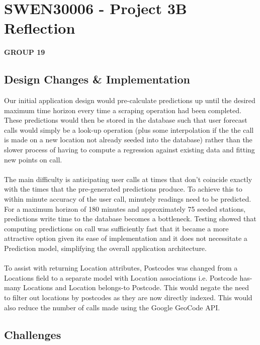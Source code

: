 \documentclass[10pt]{article}
\begin{document}
\section*{SWEN30006 - Project 3B Reflection}

\textbf{GROUP 19}

\subsection*{Design Changes \& Implementation}

\noindent Our initial application design would pre-calculate predictions up until the desired maximum time horizon every time a scraping operation had been completed. These predictions would then be stored in the database such that user forecast calls would simply be a look-up operation (plus some interpolation if the the call is made on a new location not already seeded into the database) rather than the slower process of having to compute a regression against existing data and fitting new points on call. \\\\
The main difficulty is anticipating user calls at times that don't coincide exactly with the times that the pre-generated predictions produce. To achieve this to within minute accuracy of the user call, minutely readings need to be predicted. For a maximum horizon of 180 minutes and approximately 75 seeded stations, predictions write time to the database becomes a bottleneck. Testing showed that computing predictions on call was sufficiently fast that it became a more attractive option given its ease of implementation and it does not necessitate a Prediction model, simplifying the overall application architecture. \\\\ 
To assist with returning Location attributes, Postcodes was changed from a Locations field to a separate model with Location associations i.e. Postcode has-many Locations and Location belongs-to Postcode. This would negate the need to  filter out locations by postcodes as they are now directly indexed. This would also reduce the number of calls made using the Google GeoCode API.

\subsection*{Challenges}
\end{document}
